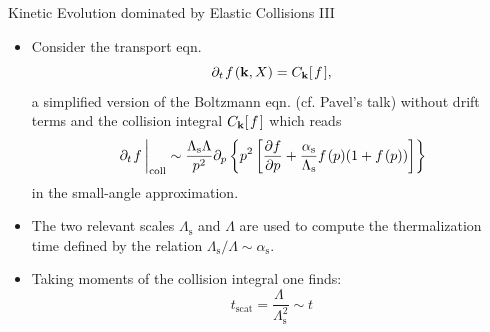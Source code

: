 \begin{frame}{Kinetic Evolution dominated by Elastic Collisions III}
\begin{itemize}
	\item Consider the \alert{transport eqn.}
	\begin{equation}
		\partial_t\hspace{0.1em} f\hspace{0.1em}(\mathbf{k},X) = C_{\mathbf{k}}[\hspace{0.1em}f\hspace{0.1em}],
	\end{equation}
	a simplified version of the \alert{Boltzmann eqn.} (cf. Pavel's talk) without drift terms and the \alert{collision integral} $ C_{\mathbf{k}}[\hspace{0.1em}f\hspace{0.1em}]$ which reads
	\begin{equation}
		\eval{\partial_t\hspace{0.1em} f\hspace{0.2em}}_{\mathrm{coll}} \sim \frac{\Lambda_{\mathrm{s}}\Lambda}{p^2}\partial_p\left\{p^2\left[\frac{\partial f}{\partial p} + \frac{\alpha_{\mathrm{s}}}{\Lambda_{\mathrm{s}}}f\hspace{0.1em}(p)(1+f\hspace{0.1em}(p))\right]\right\}
	\end{equation}
	in the small-angle approximation.
	\item The two relevant scales $\Lambda_{\mathrm{s}}$ and $\Lambda$ are used to compute the \alert{thermalization time} defined by the relation $\Lambda_{\mathrm{s}}/\Lambda\sim\alpha_{\mathrm{s}}$.
	\item Taking moments of the collision integral one finds:
	\begin{equation}
		t_{\mathrm{scat}} = \frac{\Lambda\phantom{.}}{\Lambda_{\mathrm{s}}^2} \sim t
	\end{equation}
\end{itemize}
\end{frame}


